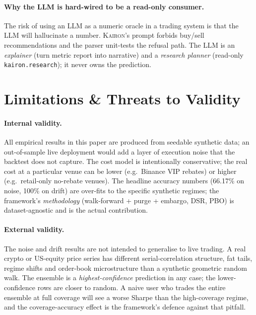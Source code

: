 \documentclass[11pt,a4paper]{article}
\let\oldsection\section
\renewcommand{\section}{\clearpage\oldsection}
\providecommand{\kairon}{\textsc{Kairon}}
\begin{document}
\paragraph{Why the LLM is hard-wired to be a
read-only consumer.} The risk of using an LLM as a
numeric oracle in a trading system is that the LLM
will hallucinate a number. \kairon{}'s prompt forbids
buy/sell recommendations and the parser unit-tests the
refusal path. The LLM is an \emph{explainer} (turn
metric report into narrative) and a \emph{research
planner} (read-only \texttt{kairon.research}); it
never owns the prediction.

\section{Limitations \& Threats to Validity}\label{sec:limit}

\paragraph{Internal validity.}
All empirical results in this paper are produced from
seedable synthetic data; an out-of-sample live
deployment would add a layer of execution noise that
the backtest does not capture. The cost model is
intentionally conservative; the real cost at a
particular venue can be lower (e.g.\ Binance VIP
rebates) or higher (e.g.\ retail-only no-rebate
venues). The headline accuracy numbers (66.17\% on
noise, 100\% on drift) are over-fits to the specific
synthetic regimes; the framework's \emph{methodology}
(walk-forward + purge + embargo, DSR, PBO) is
dataset-agnostic and is the actual contribution.

\paragraph{External validity.}
The noise and drift results are not intended to
generalise to live trading. A real crypto or
US-equity price series has different serial-correlation
structure, fat tails, regime shifts and order-book
microstructure than a synthetic geometric random
walk. The ensemble is a \emph{highest-confidence}
prediction in any case; the lower-confidence rows are
closer to random. A naive user who trades the entire
ensemble at full coverage will see a worse Sharpe
than the high-coverage regime, and the
coverage-accuracy effect is the framework's defence
against that pitfall.
\end{document}
